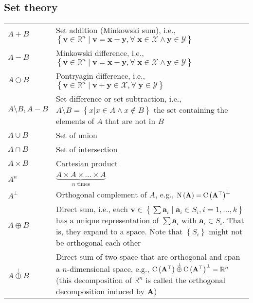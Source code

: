 \documentclass{article}
\newcommand{\nullspace}[1]{\ensuremath{\textnormal{N}\left(#1\right)}} %
\newcommand{\range}[1]{\ensuremath{\textnormal{C}\left(#1\right)}} %
\begin{document}
\subsection{Set theory}
\begin{xltabular}{\textwidth}{XX}
    \(A + B\) & Set addition (Minkowski sum), i.e., \(\left\{ \mathbf{v} \in \mathbb{R}^{n} \mid \mathbf{v} = \mathbf{x}+\mathbf{y}, \forall \; \mathbf{x} \in \mathcal{X} \wedge \mathbf{y} \in \mathcal{Y} \right\}\) \cite{kouvaritakisModelPredictiveControl2016}\\
    \(A - B\) &  Minkowski difference, i.e., \(\left\{ \mathbf{v} \in \mathbb{R}^{n} \mid \mathbf{v} = \mathbf{x}-\mathbf{y}, \forall \; \mathbf{x} \in \mathcal{X} \wedge \mathbf{y} \in \mathcal{Y} \right\}\)\\
    \(A \ominus B\) & Pontryagin difference, i.e., \(\left\{ \mathbf{v} \in \mathbb{R}^{n} \mid \mathbf{v} + \mathbf{y} \in \mathcal{X} , \forall \; \mathbf{y} \in \mathcal{Y} \right\}\) \cite{kouvaritakisModelPredictiveControl2016}\\
    \(A \setminus B, A-B\) & Set difference or set subtraction, i.e., \(A \setminus B = \left\{ x \vert x \in A \wedge x \not\in B \right\}\) the set containing the elements of \(A\) that are not in \(B\) \cite{rosenDiscreteMathematicsIts2011}\\
    \(A \cup B\) & Set of union\\
    \(A \cap B\) & Set of intersection\\
    \(A \times B\) & Cartesian product\\
    \(A^n\) & \(\underbrace{A \times A \times \dots \times A}_{n \text{ times}}\)\\
    \(A^{\perp}\) & Orthogonal complement of \(A\), e.g., \(\nullspace{\mathbf{A}} = \range{\mathbf{A}^{\top}}^{\perp}\) \cite{boydConvexOptimization2004}\\
    \(A \oplus B\) & Direct sum, i.e., each \(\mathbf{v} \in \left\{ \sum \mathbf{a}_i \mid \mathbf{a}_i \in S_i, i=1,\dots,k \right\}\) has a unique representation of \(\sum \mathbf{a}_i\) with \(\mathbf{a}_i \in S_i\). That is, they expand to a space. Note that \(\left\{ S_i \right\}\) might not be orthogonal each other \cite{golubMatrixComputations2013}\\
    \(A \overset{\perp}{\oplus} B\) & Direct sum of two space that are orthogonal and span a \(n\)-dimensional space, e.g., \(\range{\mathbf{A}^{\top}} \overset{\perp}{\oplus} \range{\mathbf{A}^{\top}}^{\perp} = \mathbb{R}^{n}\) (this decomposition of \(\mathbb{R}^{n}\) is called the orthogonal decomposition induced by \(\mathbf{A}\)) \cite{boydConvexOptimization2004}\\

\end{xltabular}
\end{document}
